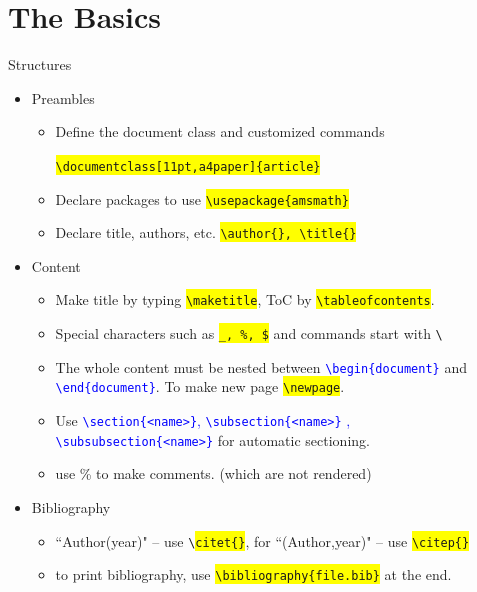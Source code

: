 \documentclass[
11pt, %
]{beamer}
\newcommand{\blue}[1]{\textcolor{blue}{#1}}
\begin{document}
	\section{The Basics}
	\begin{frame}{Structures}
		\begin{itemize}
			\item Preambles
				\begin{itemize}
					\item Define the document class and customized commands 
					
					\colorbox{yellow}{\texttt{\textbackslash documentclass[11pt,a4paper]\{article\}}}
					\item Declare packages to use \colorbox{yellow}{\texttt{\textbackslash usepackage\{amsmath\}}}
					\item Declare title, authors, etc. \colorbox{yellow}{\texttt{\textbackslash author\{\}, \textbackslash title\{\}}}
				\end{itemize}
			\item Content
			\begin{itemize}
					\item Make title by typing \colorbox{yellow}{\texttt{\textbackslash maketitle}}, ToC by \colorbox{yellow}{\texttt{\textbackslash tableofcontents}}.
					\item Special characters such as \colorbox{yellow}{\texttt{\_, \%, \$}} and commands start with \texttt{\textbackslash}
					\item The whole content must be nested between \blue{\texttt{\textbackslash begin\{document\}}} and \blue{\texttt{\textbackslash end\{document\}}}. To make new page \colorbox{yellow}{\texttt{\textbackslash newpage}}.
					\item Use \blue{\texttt{\textbackslash section\{<name>\}}, \texttt{\textbackslash subsection\{<name>\}} , \texttt{\textbackslash subsubsection\{<name>\}} } for automatic sectioning.
					\item use \% to make comments. (which are not rendered)
				\end{itemize}
			\item Bibliography
			\begin{itemize}
					\item ``Author(year)" -- use \texttt{\textbackslash \colorbox{yellow}{citet\{\}}}, for ``(Author,year)" -- use \colorbox{yellow}{\texttt{\textbackslash citep\{\}}}
					\item to print bibliography, use \colorbox{yellow}{\texttt{\textbackslash bibliography\{file.bib\}}} at the end.
			\end{itemize}
		\end{itemize}
	\end{frame}
	
\end{document}
